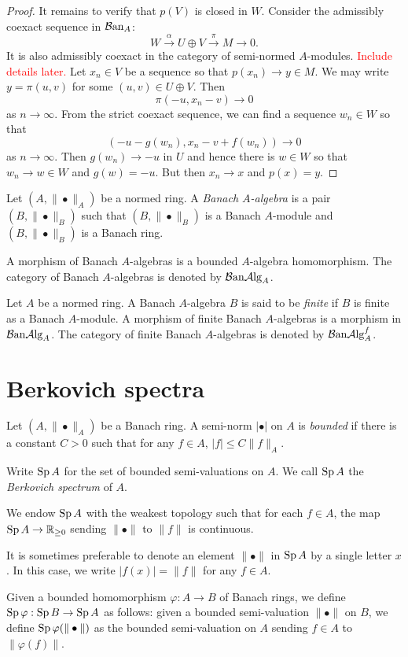 \begin{proof}
    It remains to verify that $p(V)$ is closed in $W$. Consider the admissibly coexact sequence in $\mathcal{B}\mathrm{an}_A$:
    \[
      W \xrightarrow{\alpha}U\oplus V\xrightarrow{\pi} M\rightarrow 0. 
    \]
    It is also admissibly coexact in the category of semi-normed $A$-modules. \textcolor{red}{Include details later.}
    Let $x_n\in V$ be a sequence so that $p(x_n)\to y\in M$. We may write $y=\pi(u,v)$ for some $(u,v)\in U\oplus V$. Then
    \[
        \pi(-u,x_n-v)\to 0  
    \]
    as $n\to \infty$. From the strict coexact sequence, we can find a sequence $w_n\in W$ so that
    \[
        (-u-g(w_n),x_n-v+f(w_n))\to 0  
    \]
    as $n\to \infty$. Then $g(w_n)\to -u$ in $U$ and hence there is $w\in W$ so that $w_n\to w\in W$ and $g(w)=-u$. But then $x_n\to x$ and $p(x)=y$.
\end{proof}


\begin{definition}
    Let $(A,\|\bullet\|_A)$ be a normed ring. A \emph{Banach $A$-algebra} is a pair $(B,\|\bullet\|_B)$ such that $(B,\|\bullet\|_B)$ is a Banach $A$-module and $(B,\|\bullet\|_B)$ is a Banach ring.

    A morphism of Banach $A$-algebras is a bounded $A$-algebra homomorphism. The category of Banach $A$-algebras is denoted by $\mathcal{B}\mathrm{an}\mathcal{A}\mathrm{lg}_A$.
\end{definition}

\begin{definition}\label{def-finiteBanachalgebra}
    Let $A$ be a normed ring. A Banach $A$-algebra $B$ is said to be \emph{finite} if $B$ is finite as a Banach $A$-module. A morphism of finite Banach $A$-algebras is a morphism in $\mathcal{B}\mathrm{an}\mathcal{A}\mathrm{lg}_A$. The category of finite Banach $A$-algebras is denoted by $\mathcal{B}\mathrm{an}\mathcal{A}\mathrm{lg}_A^f$.
\end{definition}

\section{Berkovich spectra}


\begin{definition}\label{def-Berkspectrum}
    Let $(A,\|\bullet\|_A)$ be a Banach ring. A semi-norm $|\bullet|$ on $A$ is \emph{bounded} if there is a constant $C>0$ such that for any $f\in A$, $|f|\leq C\|f\|_A$.

    Write $\operatorname{Sp} A$ for the set of bounded semi-valuations on $A$. We call $\operatorname{Sp} A$ the \emph{Berkovich spectrum} of $A$.

    We endow $\operatorname{Sp} A$ with the weakest topology such that for each $f\in A$, the map $\operatorname{Sp} A\rightarrow \mathbb{R}_{\geq 0}$ sending $\|\bullet\|$ to $\|f\|$ is continuous.

    It is sometimes preferable to denote an element $\|\bullet\|$ in $\operatorname{Sp} A$ by a single letter $x$. In this case, we write $|f(x)|=\|f\|$ for any $f\in A$.

    Given a bounded homomorphism $\varphi:A\rightarrow B$ of Banach rings, we define $\operatorname{Sp} \varphi:\operatorname{Sp} B\rightarrow \operatorname{Sp} A$ as follows: given a bounded semi-valuation $\|\bullet\|$ on $B$, we define $\operatorname{Sp} \varphi(\|\bullet\|)$ as the bounded semi-valuation on $A$ sending $f\in A$ to $\|\varphi(f)\|$.
\end{definition}

